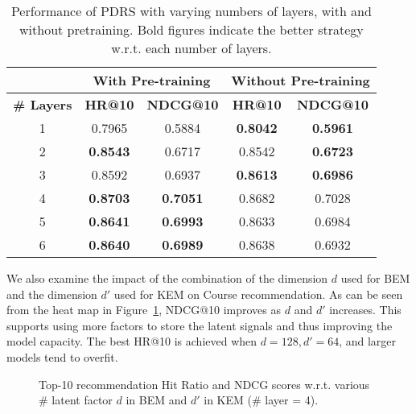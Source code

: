 \begin{table}[h!]
\setlength{\abovecaptionskip}{-0.4cm}
\begin{tabular}{|c|c|c|c|c|}
\hline
       & \multicolumn{2}{c|}{\textbf{With Pre-training}} & \multicolumn{2}{c|}{\textbf{Without Pre-training}} \\ \hline
\textbf{\# Layers} & \textbf{HR@10} & \textbf{NDCG@10}  & \textbf{HR@10}  & \textbf{NDCG@10}   \\ \hline
1 & 0.7965 & 0.5884    & \textbf{0.8042}  & \textbf{0.5961}    \\ \hline
2 & \textbf{0.8543} & 0.6717    & 0.8542 & \textbf{0.6723}              \\ \hline
3 & 0.8592 & 0.6937    & \textbf{0.8613} & \textbf{0.6986}              \\ \hline
4 & \textbf{0.8703}    & \textbf{0.7051}   & 0.8682 & 0.7028              \\ \hline
5 & \textbf{0.8641}    & \textbf{0.6993}   & 0.8633 & 0.6984              \\ \hline
6 & \textbf{0.8640}    & \textbf{0.6989}   & 0.8638 & 0.6932              \\ \hline
\end{tabular}
\caption{Performance of PDRS with varying numbers of layers, with and without pretraining. Bold figures indicate the better strategy w.r.t. each number of layers.}
\label{tab:pretrain}
\end{table}

We also examine the impact of the combination of the dimension $d$ used for BEM and the dimension $d'$ used for KEM on Course recommendation. As can be seen from the heat map in Figure~\ref{fig:heatmap}, NDCG@10 improves as $d$ and $d'$ increases.  This supports using more factors to store the latent signals and thus improving the model capacity. The best HR@10 is achieved when $d=128, d'=64$, and larger models tend to overfit.

\begin{figure}[h] 
    \centering
    \setlength{\abovecaptionskip}{-0cm}
    \setlength{\belowcaptionskip}{-0.4cm}
	\subfigtopskip=2pt 
	\subfigbottomskip=2pt 
	\subfigcapskip=-5pt
	\caption{Top-10 recommendation Hit Ratio and NDCG scores w.r.t. various \# latent factor $d$ in BEM and $d'$ in KEM (\# layer = 4).}
	\label{fig:heatmap}
\end{figure}